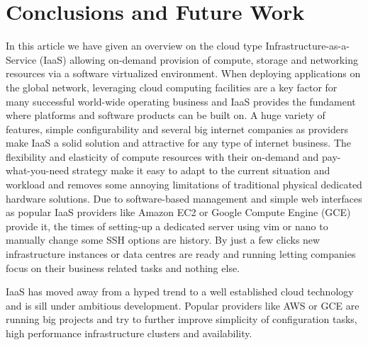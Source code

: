 \chapter{Conclusions and Future Work}
\label{chap:conclusion}

In this article we have given an overview on the cloud type Infrastructure-as-a-Service (IaaS) allowing on-demand provision of compute, storage and networking resources via a software virtualized environment. When deploying applications on the global network, leveraging cloud computing facilities are a key factor for many successful world-wide operating business and IaaS provides the fundament where platforms and software products can be built on. A huge variety of features, simple configurability and several big internet companies as providers make IaaS a solid solution and attractive for any type of internet business. The flexibility and elasticity of compute resources with their on-demand and pay-what-you-need strategy make it easy to adapt to the current situation and workload and removes some annoying limitations of traditional physical dedicated hardware solutions. Due to software-based management and simple web interfaces as popular IaaS providers like Amazon EC2 or Google Compute Engine (GCE) provide it, the times of setting-up a dedicated server using vim or nano to manually change some SSH options are history. By just a few clicks new infrastructure instances or data centres are ready and running letting companies focus on their business related tasks and nothing else. 

IaaS has moved away from a hyped trend to a well established cloud technology and is sill under ambitious development. Popular providers like AWS or GCE are running big projects and try to further improve simplicity of configuration tasks, high performance infrastructure clusters and availability.

